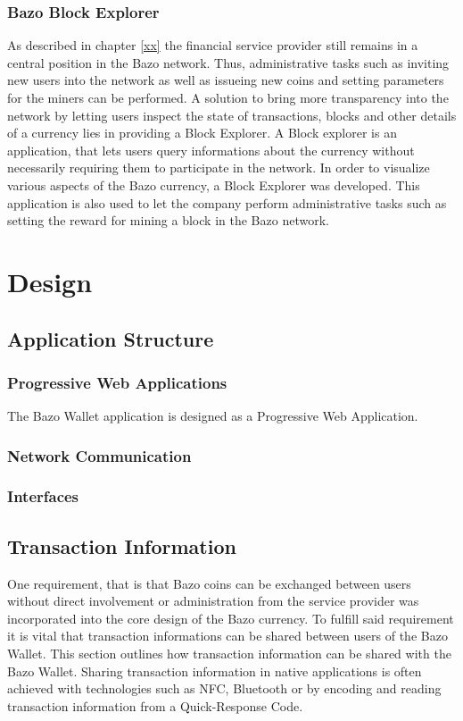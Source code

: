 \documentclass[a4paper]{article}
\begin{document}
\subsubsection{Bazo Block Explorer}
As described in chapter \ref{xx} the financial service provider still remains in a central position in the Bazo network. Thus, administrative tasks such as inviting new users into the network as well as issueing new coins and setting 
parameters for the miners can be performed.
A solution to bring more transparency into the network by letting users inspect the state of transactions, blocks and other details of a currency lies in providing a Block Explorer. A Block explorer is an application, that lets users query informations about the currency without necessarily requiring them to participate in the network.
In order to visualize various aspects of the Bazo currency, a Block Explorer was developed. This application is also used to let the company perform administrative tasks such as setting the reward for mining a block in the Bazo network.
\newpage


\section{Design}

\subsection{Application Structure}

\subsubsection{Progressive Web Applications}
The Bazo Wallet application is designed as a Progressive Web Application. 
\subsubsection{Network Communication}
\subsubsection{Interfaces}

\subsection{Transaction Information}
One requirement, that is that Bazo coins can be exchanged between users without direct involvement or administration from the service provider was incorporated into the core design of the Bazo currency. To fulfill said requirement it is vital that transaction informations can be shared between users of the Bazo Wallet. This section outlines how transaction information can be shared with the Bazo Wallet.
Sharing transaction information in native applications is often achieved with technologies such as NFC, Bluetooth or by encoding and reading transaction information from a Quick-Response Code.
\end{document}

